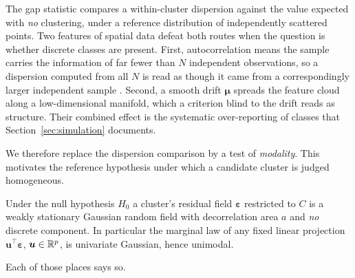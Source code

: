 The gap statistic \citep{Tibshirani2001} compares a within-cluster
dispersion against the value expected with \emph{no} clustering, under a
reference distribution of independently scattered points.  Two features of spatial data defeat both routes when
the question is whether discrete classes are present. First, autocorrelation
means the sample carries the information of far fewer than $N$ independent
observations, so a dispersion computed from all $N$ is read as though it came
from a correspondingly larger independent sample
\citep{Cressie1993,Dutilleul1993}. Second, a smooth drift $\bm\mu$ spreads the
feature cloud along a low-dimensional manifold, which a criterion blind to the
drift reads as structure.  Their
combined effect is the systematic over-reporting of classes that
Section~\ref{sec:simulation} documents.

We therefore replace the dispersion comparison by a test of \emph{modality}.
 This motivates the reference hypothesis under
which a candidate cluster is judged homogeneous.

\begin{assumption}\label{ass:null}
Under the null hypothesis $H_0$ a cluster's residual field $\bm\varepsilon$ restricted to
$C$ is a weakly stationary Gaussian random field with decorrelation area
$a$ and \emph{no} discrete component. In particular the marginal law of any
fixed linear projection $\bm u^{\!\top}\bm\varepsilon$, $\bm u\in\mathbb{R}^p$, is
univariate Gaussian, hence unimodal.
\end{assumption}

  Each of those places says so.

